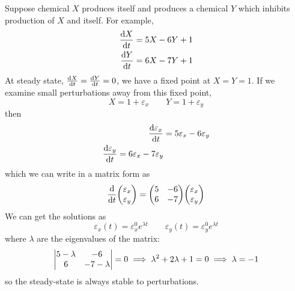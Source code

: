 \documentclass[a4paper,twoside,master.tex]{subfiles}
\begin{document}
Suppose chemical $ X $ produces itself and produces a chemical $ Y $ which inhibits production of $ X $ and itself. For example,
\begin{align}
    \dv{X}{t} &= 5X - 6Y + 1 \\
    \dv{Y}{t} &= 6X - 7Y + 1
\end{align}
At steady state, $ \dv{X}{t} = \dv{Y}{t} = 0 $, we have a fixed point at $ X = Y = 1 $. If we examine small perturbations away from this fixed point,
\begin{equation}
    X = 1 + \varepsilon_x \qquad Y = 1 + \varepsilon_y
\end{equation}
then
\begin{align}
    \dv{\varepsilon_x}{t} &= 5 \varepsilon_x - 6 \varepsilon_y \\
    \dv{\varepsilon_y}{t} = 6 \varepsilon_x - 7 \varepsilon_y
\end{align}
which we can write in a matrix form as
\begin{equation}
    \dv{t} \mqty(\varepsilon_x \\ \varepsilon_y) = \mqty(5 & -6 \\ 6 & -7) \mqty(\varepsilon_x\\ \varepsilon_y)
\end{equation}
We can get the solutions as
\begin{equation}
    \varepsilon_x(t) = \varepsilon_x^0 e^{\lambda t} \qquad \varepsilon_y(t) = \varepsilon_y^0 e^{\lambda t}
\end{equation}
where $ \lambda $ are the eigenvalues of the matrix:
\begin{equation}
    \mqty|5 - \lambda & -6 \\ 6 & -7 - \lambda | = 0 \implies \lambda^2 + 2 \lambda + 1 = 0 \implies \lambda = -1
\end{equation}
so the steady-state is always stable to perturbations.
\end{document}
